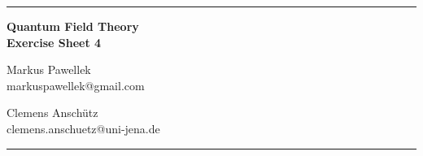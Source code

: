 \documentclass[10pt,fleqn]{article}
\begin{document}
  \hrule
  \medskip
  \begin{center}
    \Large
    \textbf{Quantum Field Theory \\ Exercise Sheet 4}
  \end{center}
  \medskip
  \begin{minipage}[t]{0.45\textwidth}
    \begin{raggedleft}
      Markus Pawellek\\
      markuspawellek@gmail.com\\
    \end{raggedleft}
  \end{minipage}
  \hfill
  \begin{minipage}[t]{0.45\textwidth}
    Clemens Anschütz\\
    clemens.anschuetz@uni-jena.de
  \end{minipage}
  \medskip
  \hrule
  \bigskip
\end{document}
